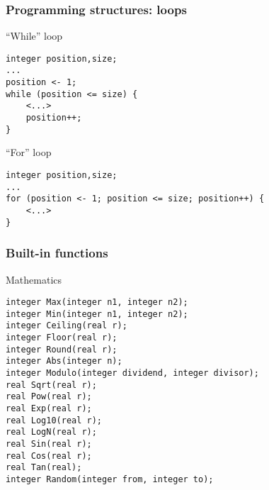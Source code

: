 \documentclass[11pt]{beamer}
\begin{document}
\begin{frame}[fragile]
\frametitle{Programming structures: loops}
\begin{block}{``While'' loop}
\scriptsize
\begin{lstlisting}[language=lekta]
integer position,size;
...
position <- 1;
while (position <= size) {
	<...>
	position++;
}
\end{lstlisting}
\end{block}
\pause
{}
\begin{block}{``For'' loop}
\scriptsize
\begin{lstlisting}[language=lekta]
integer position,size;
...
for (position <- 1; position <= size; position++) {
	<...>
}
\end{lstlisting}
\end{block}
\end{frame}

\begin{frame}[fragile]
\frametitle{Built-in functions}
\begin{block}{Mathematics}
\scriptsize
\begin{lstlisting}[language=lekta]
integer Max(integer n1, integer n2);
integer Min(integer n1, integer n2);
integer Ceiling(real r);
integer Floor(real r);
integer Round(real r);
integer Abs(integer n);
integer Modulo(integer dividend, integer divisor);
real Sqrt(real r);
real Pow(real r);
real Exp(real r);
real Log10(real r);
real LogN(real r);
real Sin(real r);
real Cos(real r);
real Tan(real);
integer Random(integer from, integer to);
\end{lstlisting}
\end{block}
\end{frame}
\end{document}
